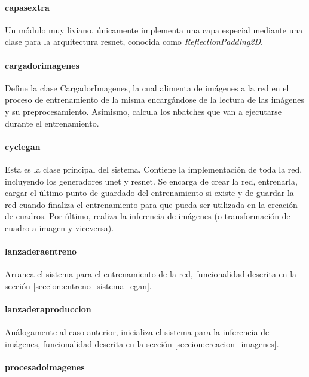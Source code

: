\documentclass[../main.tex]{subfiles}
\begin{document}
    \paragraph{capas\textunderscore extra}
    Un módulo muy liviano, únicamente implementa una capa especial mediante una clase para la arquitectura resnet, conocida como \textit{ReflectionPadding2D}.
    
    \paragraph{cargador\textunderscore imagenes}
    Define la clase CargadorImagenes, la cual alimenta de imágenes a la red en el proceso de entrenamiento de la misma encargándose de la lectura de las imágenes y su preprocesamiento. Asimismo, calcula los n\textunderscore batches que van a ejecutarse durante el entrenamiento. 
    
    \paragraph{cyclegan}
    Esta es la clase principal del sistema. Contiene la implementación de toda la red, incluyendo los generadores unet y resnet. Se encarga de crear la red, entrenarla, cargar el último punto de guardado del entrenamiento si existe y de guardar la red cuando finaliza el entrenamiento para que pueda ser utilizada en la creación de cuadros. Por último, realiza la inferencia de imágenes (o transformación de cuadro a imagen y viceversa).
    
    \paragraph{lanzadera\textunderscore entreno}
    Arranca el sistema para el entrenamiento de la red, funcionalidad descrita en la sección \ref{seccion:entreno_sistema_cgan}.
    
    \paragraph{lanzadera\textunderscore produccion}
    Análogamente al caso anterior, inicializa el sistema para la inferencia de imágenes, funcionalidad descrita en la sección \ref{seccion:creacion_imagenes}.
    
    \paragraph{procesado\textunderscore imagenes}
    
\end{document}
